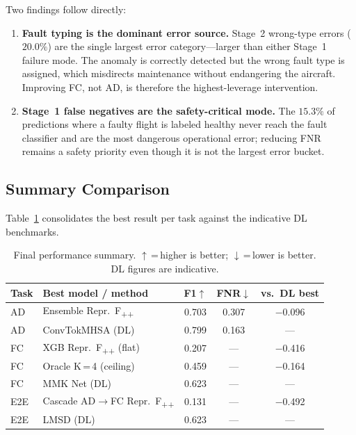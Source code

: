 Two findings follow directly:

\begin{enumerate}
    \item \textbf{Fault typing is the dominant error source.} Stage~2 wrong-type
          errors ($20.0\%$) are the single largest error category---larger than
          either Stage~1 failure mode. The anomaly is correctly detected but the
          wrong fault type is assigned, which misdirects maintenance without
          endangering the aircraft. Improving FC, not AD, is therefore the
          highest-leverage intervention.

    \item \textbf{Stage~1 false negatives are the safety-critical mode.} The
          $15.3\%$ of predictions where a faulty flight is labeled healthy never
          reach the fault classifier and are the most dangerous operational
          error; reducing FNR remains a safety priority even though it is not the
          largest error bucket.
\end{enumerate}

\subsection{Summary Comparison}
\label{subsec:summary_compare}

Table~\ref{tab:final_summary} consolidates the best result per task against the
indicative DL benchmarks.

\begin{table}[H]
    \centering
    \caption{Final performance summary. $\uparrow$\,=\,higher is better;
             $\downarrow$\,=\,lower is better. DL figures are indicative.}
    \label{tab:final_summary}
    \begin{tabular}{llccc}
        \toprule
        \textbf{Task} & \textbf{Best model / method} & \textbf{F1}$\uparrow$ & \textbf{FNR}$\downarrow$ & \textbf{vs.\ DL best} \\
        \midrule
        AD  & Ensemble Repr.~F\textsubscript{++}  & 0.703 & 0.307 & $-$0.096 \\
        AD  & ConvTokMHSA (DL)        & 0.799 & 0.163 & --- \\
        \midrule
        FC  & XGB Repr.~F\textsubscript{++} (flat) & 0.207 & --- & $-$0.416 \\
        FC  & Oracle K\,=\,4 (ceiling) & 0.459 & ---  & $-$0.164 \\
        FC  & MMK Net (DL)            & 0.623 & ---   & --- \\
        \midrule
        E2E & Cascade AD$\to$FC Repr.~F\textsubscript{++} & 0.131 & --- & $-$0.492 \\
        E2E & LMSD (DL)              & 0.623 & ---   & --- \\
        \bottomrule
    \end{tabular}
\end{table}

